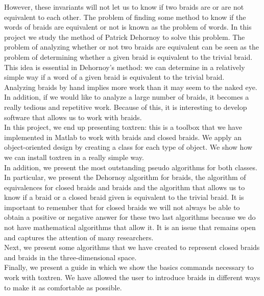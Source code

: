 However, these invariants will not let us to know if two braids are or are not equivalent to each other. The problem of finding some method to know if the words of braids are equivalent or not is known as the problem of words. In this project we study the method of Patrick Dehornoy to solve this problem. The problem of analyzing whether or not two braids are equivalent can be seen as the problem of determining whether a given braid is equivalent to the trivial braid. This idea is essential in Dehornoy's method: we can determine in a relatively simple way if a word of a given braid is equivalent to the trivial braid.\\








Analyzing braids by hand implies more work than it may seem to the naked eye. In addition, if we would like to analyze a large number of braids, it becomes a really tedious and repetitive work. Because of this, it is interesting to develop software that allows us to work with braids.\\








In this project, we end up presenting toxtren: this is a toolbox that we have implemented in Matlab to work with braids and closed braids. We apply an object-oriented design by creating a class for each type of object. We show how we can install toxtren in a really simple way.\\


In addition, we present the most outstanding pseudo algorithms for both classes. In particular, we present the Dehornoy algorithm for braids, the algorithm of equivalences for closed braids and braids and the algorithm that allows us to know if a braid or a closed braid given is equivalent to the trivial braid. It is important to remember that for closed braids we will not always be able to obtain a positive or negative answer for these two last algorithms because we do not have mathematical algorithms that allow it. It is an issue that remains open and captures the attention of many researchers.\\ Next, we present some algorithms that we have created to represent closed braids and braids in the three-dimensional space.\\




Finally, we present a guide in which we show the basics commands necessary to work with toxtren. We have allowed the user to introduce braids in different ways to make it as comfortable as possible.\\

